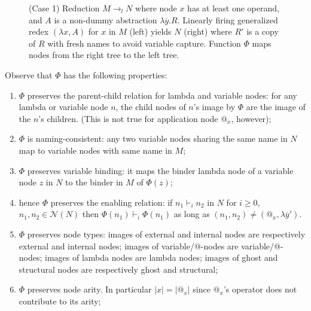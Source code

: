 \documentclass{article}
\theoremstyle{plain}
\theoremstyle{definition}
\theoremstyle{remark}
\newcommand\Nodes{\mathcal{N}}%
\newcommand{\enables}{\vdash} %
\begin{document}
\begin{description}[itemindent=0em,leftmargin=0cm]
\begin{figure}[htbp]
    \caption{(Case 1) Reduction $M\rightarrow_l N$ where node $x$ has at least one operand, and $A$ is a non-dummy
     abstraction $\lambda\overline{y} . R$. Linearly firing  generalized redex $(\lambda x, A)$ for $x$ in $M$ (left)
     yields $N$ (right) where $R'$ is a copy of $R$ with fresh names to avoid variable capture.
    Function $\Phi$ maps nodes from the right tree to the left tree.}
    \label{fig:firing_genredex_effect_on_tree_with_operands_and_lambda_argument}
    \end{figure}


Observe that $\Phi$ has the following properties:
\begin{enumerate}[label=(\roman*)]
    \item $\Phi$ preserves the parent-child relation for lambda and variable nodes: for any lambda or variable node $n$, the child nodes of $n$'s image by $\Phi$ are the image of the $n$'s children. (This is not true for application node $@_x$, however);

    \item $\Phi$ is naming-consistent: any two variable nodes sharing the same name  in $N$ map to variable nodes with same name in $M$;

    \item $\Phi$ preserves variable binding: it maps the binder lambda node of a variable node $z$ in $N$ to the binder in $M$ of $\Phi(z)$;

    \item hence $\Phi$ preserves the enabling relation: if $n_1 \enables_i n_2$ in $N$ for $i\geq 0$, $n_1,n_2 \in \Nodes(N)$ then $\Phi(n_1) \enables_i \Phi(n_1)$ as long as $(n_1,n_2) \neq (@_x,\lambda\overline{y}')$.

    \item $\Phi$ preserves node types: images of external and internal nodes are respectively external and internal nodes; images of variable/@-nodes are variable/@-nodes; images of lambda nodes are lambda nodes; images of ghost and structural nodes are respectively ghost and structural;

    \item $\Phi$ preserves node arity. In particular $|x| = |@_x|$ since $@_x$'s operator does not contribute to its arity;


\end{enumerate}
\end{description}
\end{document}
